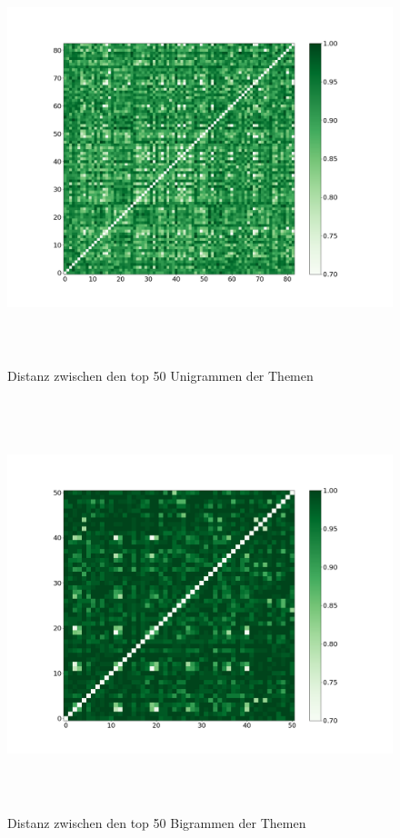 \begin{figure}[htpb]
	\centering
	\includegraphics[width=\textwidth,height=12cm,keepaspectratio=true]{img/unigram_jaccard_50_green_07.png}
	\caption{
		Distanz zwischen den top 50 Unigrammen der Themen
	}
	\label{fig:Distanz_Unigramme}
\end{figure}

\begin{figure}[htpb]
	\centering
	\includegraphics[width=\textwidth,height=12cm,keepaspectratio=true]{img/bigram_jaccard_50_green_07.png}
	\caption{
		Distanz zwischen den top 50 Bigrammen der Themen
	}
	\label{fig:Distanz_Bigramme}
\end{figure}
